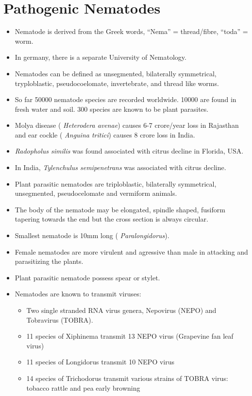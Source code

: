 \documentclass[
  openany]{book}
\providecommand{\tightlist}{%
  \setlength{\itemsep}{0pt}\setlength{\parskip}{0pt}}
\begin{document}
\hypertarget{pathogenic-nematodes}{%
\section{Pathogenic Nematodes}\label{pathogenic-nematodes}}

\begin{itemize}
\item
  Nematode is derived from the Greek words, ``Nema'' = thread/fibre, ``toda'' = worm.
\item
  In germany, there is a separate University of Nematology.
\item
  Nematodes can be defined as unsegmented, bilaterally symmetrical, tryploblastic, pseudocoelomate, invertebrate, and thread like worms.
\item
  So far 50000 nematode species are recorded worldwide. 10000 are found in fresh water and soil. 300 species are known to be plant parasites.
\item
  Molya disease ( \emph{Heterodera avenae}) causes 6-7 crore/year loss in Rajasthan and ear cockle ( \emph{Anguina tritici}) causes 8 crore loss in India.
\item
  \emph{Radopholus similis} was found associated with citrus decline in Florida, USA.
\item
  In India, \emph{Tylenchulus semipenetrans} was associated with citrus decline.
\item
  Plant parasitic nematodes are triploblastic, bilaterally symmetrical, unsegmented, pseudocelomate and vermiform animals.
\item
  The body of the nematode may be elongated, spindle shaped, fusiform tapering towards the end but the cross section is always circular.
\item
  Smallest nematode is 10mm long ( \emph{Paralongidorus}).
\item
  Female nematodes are more virulent and agressive than male in attacking and parasitizing the plants.
\item
  Plant parasitic nematode possess spear or stylet.
\item
  Nematodes are known to transmit viruses:

  \begin{itemize}
  \tightlist
  \item
    Two single stranded RNA virus genera, Nepovirus (NEPO) and Tobravirus (TOBRA).
  \item
    11 species of Xiphinema transmit 13 NEPO virus (Grapevine fan leaf virus)
  \item
    11 species of Longidorus transmit 10 NEPO virus
  \item
    14 species of Trichodorus transmit various strains of TOBRA virus: tobacco rattle and pea early browning
  \end{itemize}
\end{itemize}
\end{document}
